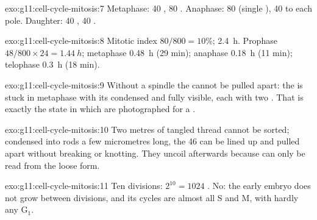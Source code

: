\begin{solution}{exo:g11:cell-cycle-mitosis:7}
Metaphase: 40 , 80 . Anaphase: 80 
(single ), 40 to each pole. Daughter: 40 , 40
.
\end{solution}

\begin{solution}{exo:g11:cell-cycle-mitosis:8}
Mitotic index $80/800 = 10\%$;  \qty{2.4}{h}. Prophase
$48/800 \times 24 = \qty{1.44}{h}$; metaphase \qty{0.48}{h} (29 min);
anaphase \qty{0.18}{h} (11 min); telophase \qty{0.3}{h} (18 min).
\end{solution}

\begin{solution}{exo:g11:cell-cycle-mitosis:9}
Without a spindle the  cannot be pulled apart: the  is
stuck in metaphase with its  condensed and fully visible,
each with two . That is exactly the state in which
 are photographed for a .
\end{solution}

\begin{solution}{exo:g11:cell-cycle-mitosis:10}
Two metres of tangled thread cannot be sorted; condensed into rods a
few micrometres long, the 46  can be lined up and pulled
apart without breaking or knotting. They uncoil afterwards because
 can only be read from the loose form.
\end{solution}

\begin{solution}{exo:g11:cell-cycle-mitosis:11}
Ten divisions: $2^{10} = 1024$ . No: the early embryo does not
grow between divisions, and its cycles are almost all S and M, with
hardly any $\mathrm{G_1}$.
\end{solution}

